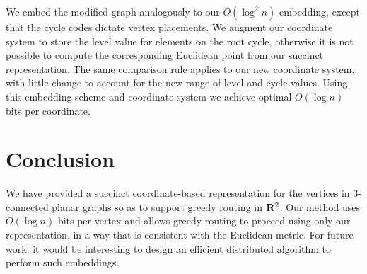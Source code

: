 \documentclass[11pt]{article}
\newcommand{\R}{{\bf R}}
\newcommand{\cycle}{\mathrm{cycle}}
\newcommand{\level}{\mathrm{level}}
\begin{document}
We embed the modified graph analogously to our $O(\log^2n)$ embedding, except
that the cycle codes dictate vertex placements.
We augment our coordinate system to store the $\level$ value 
for elements on the root cycle, otherwise it is not possible to compute the 
corresponding Euclidean point from our succinct representation.
The same comparison rule applies to our new coordinate system, with little
change to account for the new range of $\level$ and $\cycle$ values. Using this 
embedding scheme and coordinate system we achieve optimal 
$O(\log n)$ bits per coordinate.

\ifFull
\section{Conclusion}
We have provided a succinct coordinate-based representation for the
vertices in 3-connected planar graphs so as to support greedy routing in
$\R^2$.
Our method uses $O(\log n)$ bits per vertex and allows greedy routing 
to proceed using only our representation, in a way that is consistent
with the Euclidean metric.
For future work, it would be interesting to design an efficient
distributed algorithm to perform such
embeddings.
\fi



\end{document}
